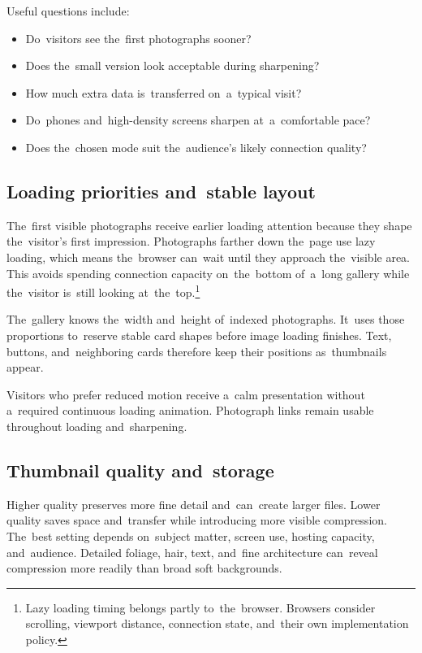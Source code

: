 \documentclass[11pt,a4paper]{article}
\begin{document}
Useful questions include:

\begin{itemize}
  \item Do~visitors see the~first photographs sooner?
  \item Does the~small version look acceptable during sharpening?
  \item How much extra data is~transferred on~a~typical visit?
  \item Do~phones and~high-density screens sharpen at~a~comfortable pace?
  \item Does the~chosen mode suit the~audience's likely connection quality?
\end{itemize}

\subsection{Loading priorities and~stable layout}

The~first visible photographs receive earlier loading attention because they
shape the~visitor's first impression. Photographs farther down the~page use lazy
loading, which means the~browser can~wait until they approach the~visible area.
This avoids spending connection capacity on~the~bottom of~a~long gallery while
the~visitor is~still looking at~the~top.\footnote{Lazy loading timing belongs
partly to~the~browser. Browsers consider scrolling, viewport distance,
connection state, and~their own implementation policy.}

The~gallery knows the~width and~height of~indexed photographs. It~uses those
proportions to~reserve stable card shapes before image loading finishes. Text,
buttons, and~neighboring cards therefore keep their positions as~thumbnails
appear.

Visitors who prefer reduced motion receive a~calm presentation without
a~required continuous loading animation. Photograph links remain usable
throughout loading and~sharpening.

\subsection{Thumbnail quality and~storage}

Higher quality preserves more fine detail and~can~create larger files. Lower
quality saves space and~transfer while introducing more visible compression.
The~best setting depends on~subject matter, screen use, hosting capacity,
and~audience. Detailed foliage, hair, text, and~fine architecture can~reveal
compression more readily than broad soft backgrounds.
\end{document}
